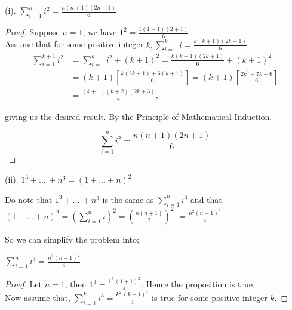 \documentclass[11pt]{amsart}
\begin{document}
(i). $\sum_{i=1}^{n} i^2 = \frac{n(n+1)(2n+1)}{6}$

\begin{proof}
	Suppose $n=1$, we have $1^2 = \frac{1(1+1)(2+1)}{6}$ \\

	Assume that for some positive integer $k, \sum_{i=1}^{k} i = \frac{k(k+1)(2k+1)}{6}$ \\

	\begin{align*}
		\sum_{i=1}^{k+1} i^2 &= \sum_{i=1}^{k} i^2 + (k+1)^2 = \frac{k(k+1)(2k+1)}{6} + (k+1)^2 \\
		&= (k+1)\left[\frac{k(2k+1)+6(k+1)}{6}\right] = (k+1)\left[\frac{2k^3 +7k + 6}{6}\right] \\
		&= \frac{(k+1)(k+2)(2k+3)}{6},
	\end{align*}

	giving us the desired result. By the Principle of Mathematical Induction,

	\[
		\sum_{i=1}^{n} i^2 = \frac{n(n+1)(2n+1)}{6}
	\]
\end{proof}

(ii). $1^3 + \dots \, + n^3 = \left(1 + \dots + n\right)^2$

\bigskip

Do note that $1^3 + \dots \, + n^3$ is the same as $\sum_{i=1}^n i^3$ and that\\

$\left(1 + \dots + n\right)^2 = \left(\sum_{i=1}^n i\right)^2 = \left(\frac{n(n+1)}{2}\right)^2$
$= \frac{n^2(n+1)^2}{4}$ \\

\medskip

So we can simplify the problem into;

\medskip

$\sum_{i=1}^n i^3 = \frac{n^2(n+1)^2}{4}$ \\

\begin{proof}
	Let $n=1$, then $1^3 = \frac{1^2 \, (1+1)^2}{4}$. Hence the proposition is true.\\

	Now assume that, $\sum_{i=1}^{k} i^3 = \frac{k^2\,(k+1)^2}{4}$ is true for some positive integer $k$.
\end{proof}
\end{document}
